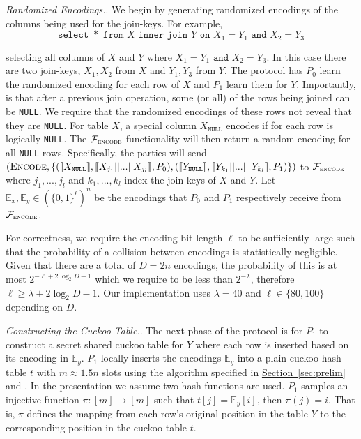 \documentclass[11pt,letterpaper]{article}
\newcommand{\Party}[1]{\ensuremath{P_{#1}}\xspace}
\newcommand{\share}[1]{\ensuremath{\llbracket #1\rrbracket}\xspace}
\newcommand{\Null}{\texttt{NULL}\xspace}
\newcommand{\XNull}{\ensuremath{X_\Null}\xspace}
\newcommand{\YNull}{\ensuremath{Y_\Null}\xspace}
\newcommand{\namedref}[2]{\hyperref[#2]{#1~\ref*{#2}}}
\newcommand{\sectionref}[1]{\namedref{Section}{#1}}
\renewcommand{\paragraph}[1]{\vspace{0.1cm}\noindent\emph{#1}.}
\newcommand{\f}[1]{\ensuremath{\mathcal{F}_{\textsc{#1}}}}
\begin{document}
\paragraph{Randomized Encodings.}
We begin by generating randomized encodings of the columns being used for the join-keys. For example, 
\iffullversion
$$
	\texttt{select }* \texttt{ from } X \texttt{ inner join } Y \texttt{ on } X_1 = Y_1 \texttt{ and } X_2 = Y_3
$$

\else
selecting all columns of $X$ and $Y$ where $X_1 = Y_1 \texttt{ and } X_2 = Y_3$.
\fi
In this case there are two join-keys, $X_1,X_2$ from $X$ and $Y_1,Y_3$ from $Y$. The protocol has \Party{0} learn the randomized encoding for each row of $X$ and \Party{1} learn them for $Y$. Importantly, is that after a previous join operation, some (or all) of the rows being joined can be \texttt{NULL}. We require that the randomized encodings of these rows not reveal that they are \texttt{NULL}. For table $X$, a special column $\XNull$ encodes if for each row is logically \texttt{NULL}. The \f{encode} functionality will then return a random encoding for all \texttt{NULL} rows. Specifically, the parties will send $(\textsc{Encode}, \{(\share{\XNull}, \share{X_{j_1}||...||X_{j_l}}, \Party{0}), (\share{\YNull}, \share{Y_{k_1}||...||$ $Y_{k_l}}, \Party{1})\})$ to \f{encode} where $j_1,...,j_l$ and $k_1,...,k_l$ index the join-keys of $X$ and $Y$. Let $\mathbb{E}_x,\mathbb{E}_y\in(\{0,1\}^{\ell})^n$ be the encodings that \Party{0} and \Party{1} respectively receive from \f{encode}.


For correctness, we require the encoding bit-length $\ell$ to be sufficiently large such that the probability of a collision between encodings is statistically negligible. Given that there are a total of $D=2n$ encodings, the probability of this is at most $2^{-\ell+2\log_2 D-1}$ which we require to be less than $2^{-\lambda}$, therefore $\ell\geq \lambda+2\log_2 D -1$. Our implementation uses $\lambda=40$ and $\ell\in\{80,100\}$ depending on $D$.




\paragraph{Constructing the Cuckoo Table.}
The next phase of the protocol is for \Party{1} to construct a secret shared cuckoo table for $Y$ where each row is inserted based on its encoding in $\mathbb{E}_y$. \Party{1} locally inserts the encodings $\mathbb{E}_y$ into a plain cuckoo hash table $t$ with $m\approx1.5n$ slots using the algorithm specified in \sectionref{sec:prelim} and \cite{DRRT18}. In the presentation we assume two hash functions are used. \Party{1} samples an injective function $\pi : [m]\rightarrow [m]$ such that  $t[j]=\mathbb{E}_y[i]$, then $\pi(j)=i$.
\iffullversion
 That is, $\pi$ defines the mapping from each row's original position in the table $Y$ to the corresponding position in the cuckoo table $t$.
\fi
\end{document}
